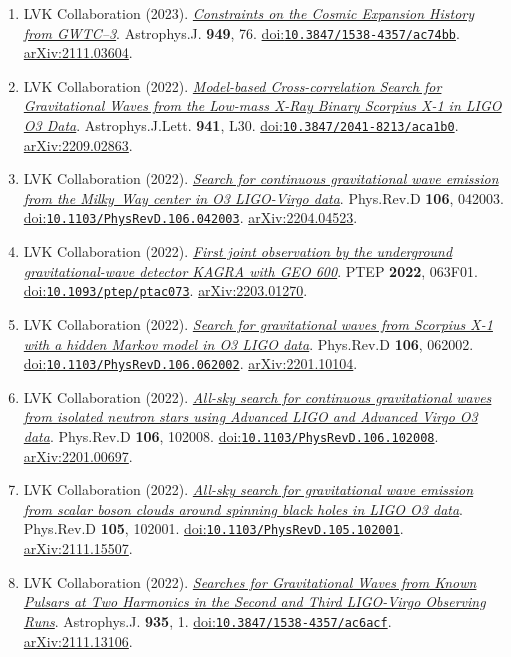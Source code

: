 \documentclass[11pt]{article}
\begin{document}
\begin{enumerate}
\item LVK Collaboration (2023). \href{https://arxiv.org/abs/2111.03604}{\textit{Constraints on the Cosmic Expansion History from GWTC--3}}. Astrophys.J. \textbf{949}, 76. \href{https://doi.org/10.3847/1538-4357/ac74bb}{doi:\nolinkurl{10.3847/1538-4357/ac74bb}}. \href{https://arxiv.org/abs/2111.03604}{arXiv:2111.03604}.
\item LVK Collaboration (2022). \href{https://arxiv.org/abs/2209.02863}{\textit{Model-based Cross-correlation Search for Gravitational Waves from the Low-mass X-Ray Binary Scorpius X-1 in LIGO O3 Data}}. Astrophys.J.Lett. \textbf{941}, L30. \href{https://doi.org/10.3847/2041-8213/aca1b0}{doi:\nolinkurl{10.3847/2041-8213/aca1b0}}. \href{https://arxiv.org/abs/2209.02863}{arXiv:2209.02863}.
\item LVK Collaboration (2022). \href{https://arxiv.org/abs/2204.04523}{\textit{Search for continuous gravitational wave emission from the Milky~Way center in O3 LIGO-Virgo data}}. Phys.Rev.D \textbf{106}, 042003. \href{https://doi.org/10.1103/PhysRevD.106.042003}{doi:\nolinkurl{10.1103/PhysRevD.106.042003}}. \href{https://arxiv.org/abs/2204.04523}{arXiv:2204.04523}.
\item LVK Collaboration (2022). \href{https://arxiv.org/abs/2203.01270}{\textit{First joint observation by the underground gravitational-wave detector KAGRA with GEO 600}}. PTEP \textbf{2022}, 063F01. \href{https://doi.org/10.1093/ptep/ptac073}{doi:\nolinkurl{10.1093/ptep/ptac073}}. \href{https://arxiv.org/abs/2203.01270}{arXiv:2203.01270}.
\item LVK Collaboration (2022). \href{https://arxiv.org/abs/2201.10104}{\textit{Search for gravitational waves from Scorpius X-1 with a hidden Markov model in O3 LIGO data}}. Phys.Rev.D \textbf{106}, 062002. \href{https://doi.org/10.1103/PhysRevD.106.062002}{doi:\nolinkurl{10.1103/PhysRevD.106.062002}}. \href{https://arxiv.org/abs/2201.10104}{arXiv:2201.10104}.
\item LVK Collaboration (2022). \href{https://arxiv.org/abs/2201.00697}{\textit{All-sky search for continuous gravitational waves from isolated neutron stars using Advanced LIGO and Advanced Virgo O3 data}}. Phys.Rev.D \textbf{106}, 102008. \href{https://doi.org/10.1103/PhysRevD.106.102008}{doi:\nolinkurl{10.1103/PhysRevD.106.102008}}. \href{https://arxiv.org/abs/2201.00697}{arXiv:2201.00697}.
\item LVK Collaboration (2022). \href{https://arxiv.org/abs/2111.15507}{\textit{All-sky search for gravitational wave emission from scalar boson clouds around spinning black holes in LIGO O3 data}}. Phys.Rev.D \textbf{105}, 102001. \href{https://doi.org/10.1103/PhysRevD.105.102001}{doi:\nolinkurl{10.1103/PhysRevD.105.102001}}. \href{https://arxiv.org/abs/2111.15507}{arXiv:2111.15507}.
\item LVK Collaboration (2022). \href{https://arxiv.org/abs/2111.13106}{\textit{Searches for Gravitational Waves from Known Pulsars at Two Harmonics in the Second and Third LIGO-Virgo Observing Runs}}. Astrophys.J. \textbf{935}, 1. \href{https://doi.org/10.3847/1538-4357/ac6acf}{doi:\nolinkurl{10.3847/1538-4357/ac6acf}}. \href{https://arxiv.org/abs/2111.13106}{arXiv:2111.13106}.
\end{enumerate}
\end{document}
